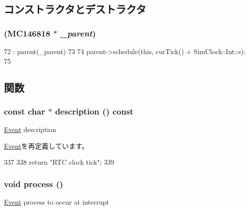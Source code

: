 \subsection{コンストラクタとデストラクタ}
\hypertarget{structMC146818_1_1RTCTickEvent_ad45ea1428a9c04a0c6a27e4338e6c6be}{
\subsubsection[{RTCTickEvent}]{ ({\bf MC146818} $\ast$ {\em \_\-parent})}}
\label{structMC146818_1_1RTCTickEvent_ad45ea1428a9c04a0c6a27e4338e6c6be}



\begin{DoxyCode}
72                                          : parent(_parent)
73         {
74             parent->schedule(this, curTick() + SimClock::Int::s);
75         }
\end{DoxyCode}


\subsection{関数}
\hypertarget{structMC146818_1_1RTCTickEvent_a5a14fe478e2393ff51f02e9b7be27e00}{
\subsubsection[{description}]{\setlength{\rightskip}{0pt plus 5cm}const char $\ast$ description () const}}
\label{structMC146818_1_1RTCTickEvent_a5a14fe478e2393ff51f02e9b7be27e00}
\hyperlink{classEvent}{Event} description 

\hyperlink{classEvent_a130ddddf003422b413e2e891b1b80e8f}{Event}を再定義しています。


\begin{DoxyCode}
337 {
338     return "RTC clock tick";
339 }
\end{DoxyCode}
\hypertarget{structMC146818_1_1RTCTickEvent_a2e9c5136d19b1a95fc427e0852deab5c}{
\subsubsection[{process}]{\setlength{\rightskip}{0pt plus 5cm}void process ()}}
\label{structMC146818_1_1RTCTickEvent_a2e9c5136d19b1a95fc427e0852deab5c}
\hyperlink{classEvent}{Event} process to occur at interrupt 

